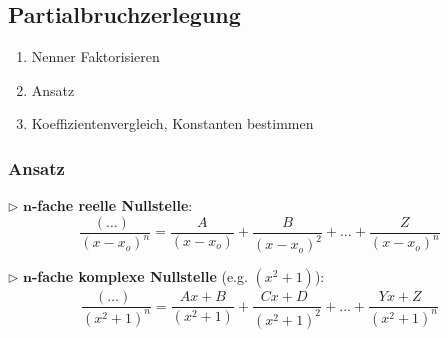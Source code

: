 \subsection{Partialbruchzerlegung}
    \begin{enumerate}
        \item Nenner Faktorisieren
        \item Ansatz
        \item Koeffizientenvergleich, Konstanten bestimmen
    \end{enumerate}
    \subsubsection*{Ansatz}
        $\triangleright$ \textbf{$\boldsymbol{n}$-fache reelle Nullstelle}:
        $$
            \frac{(\dots)\phantom{^n}}{(x-x_o)^n} = \frac{A}{(x-x_o)} + \frac{B}{(x-x_o)^2} + \dots + \frac{Z}{(x-x_o)^n}
        $$


        $\triangleright$ \textbf{$\boldsymbol{n}$-fache komplexe Nullstelle} (e.g. $(x^2+1)$):
        $$
            \frac{(\dots)\phantom{^n}}{(x^2+1)^n} = \frac{Ax+B}{(x^2+1)} + \frac{Cx+D\phantom{^2}}{(x^2+1)^2} + \dots + \frac{Yx+Z\phantom{^n}}{(x^2+1)^n}
        $$